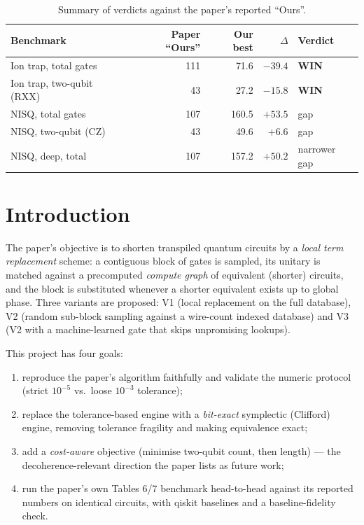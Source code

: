 \documentclass[11pt,a4paper]{article}
\begin{document}
\begin{table}[H]
\centering
\caption{Summary of verdicts against the paper's reported ``Ours''.}
\label{tab:verdict}
\begin{tabular}{lrrrl}
\toprule
Benchmark & Paper ``Ours'' & Our best & $\Delta$ & Verdict \\
\midrule
Ion trap, total gates     & 111 & 71.6  & $-39.4$  & \textbf{WIN} \\
Ion trap, two-qubit (RXX) & 43  & 27.2  & $-15.8$  & \textbf{WIN} \\
NISQ, total gates         & 107 & 160.5 & $+53.5$  & gap \\
NISQ, two-qubit (CZ)      & 43  & 49.6  & $+6.6$   & gap \\
NISQ, deep, total         & 107 & 157.2 & $+50.2$  & narrower gap \\
\bottomrule
\end{tabular}
\end{table}

\section{Introduction}
\label{sec:intro}
The paper's objective is to shorten transpiled quantum circuits by a
\emph{local term replacement} scheme: a contiguous block of gates is sampled,
its unitary is matched against a precomputed \emph{compute graph} of equivalent
(shorter) circuits, and the block is substituted whenever a shorter equivalent
exists up to global phase. Three variants are proposed: V1 (local replacement
on the full database), V2 (random sub-block sampling against a wire-count
indexed database) and V3 (V2 with a machine-learned gate that skips
unpromising lookups).

This project has four goals:
\begin{enumerate}
    \item reproduce the paper's algorithm faithfully and validate the numeric
          protocol (strict $10^{-5}$ vs.\ loose $10^{-3}$ tolerance);
    \item replace the tolerance-based engine with a \emph{bit-exact} symplectic
          (Clifford) engine, removing tolerance fragility and making
          equivalence exact;
    \item add a \emph{cost-aware} objective (minimise two-qubit count, then
          length) --- the decoherence-relevant direction the paper lists as
          future work;
    \item run the paper's own Tables 6/7 benchmark head-to-head against its
          reported numbers on identical circuits, with qiskit baselines and a
          baseline-fidelity check.
\end{enumerate}
\end{document}
